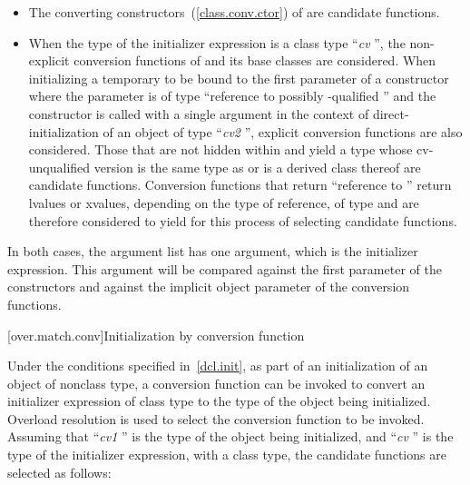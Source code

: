 \begin{itemize}
\item
The converting constructors~(\ref{class.conv.ctor}) of
are candidate functions.
\item
When the type of the initializer expression is a class type
``\textit{cv} '',
the non-explicit conversion functions of
and its base classes are considered.
When initializing a temporary to be bound to the first parameter of a
constructor
where the parameter is of type
``reference to possibly \cv-qualified ''
and the constructor is
called with a single argument in the context of
direct-initialization of an object of type ``\textit{cv2} '', explicit
conversion functions are also considered.
Those that are not hidden within
and yield a type whose cv-unqualified version is the same type as
or is a derived class thereof
are candidate functions.
Conversion functions that return ``reference to
''
return
lvalues or xvalues, depending on the type of reference, of type
and are therefore considered to yield
for this
process of selecting candidate functions.
\end{itemize}

\pnum
In both cases, the argument list has one argument, which is the initializer
expression.
\enternote
This argument will be compared against
the first parameter of the constructors and against the implicit
object parameter of the conversion functions.
\exitnote

[over.match.conv]{Initialization by conversion function}%

\pnum
Under the conditions specified in~\ref{dcl.init}, as
part of an initialization of an object of nonclass type,
a conversion function can be invoked to convert an initializer
expression of class type to the type of the object
being initialized.
Overload resolution is used to select the
conversion function to be invoked.
Assuming that ``\textit{cv1} '' is the
type of the object being initialized, and ``\textit{cv} '' is the type
of the initializer expression, with
a class type,
the candidate functions are selected as follows:

